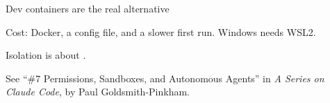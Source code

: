 \begin{frame}{Dev containers are the real alternative}
\begin{wideitemize}
    \item Cost: Docker, a config file, and a slower first run. Windows needs WSL2.
    \item Isolation is about . 
    \item See ``\#7 Permissions, Sandboxes, and Autonomous Agents'' in \emph{A Series on Claude Code}, by Paul Goldsmith-Pinkham.
\end{wideitemize}
\end{frame}

